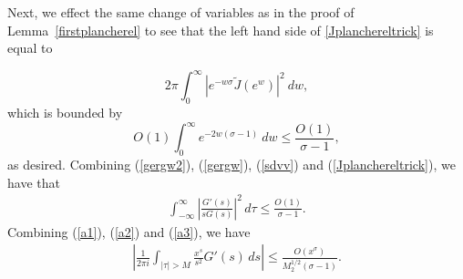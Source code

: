 \documentclass[11pt]{amsart}
\theoremstyle{definition}
\begin{document}
 Next, we effect the same change of variables as in the proof of Lemma~\ref{firstplancherel} to see that the left hand side of \eqref{Jplanchereltrick} is equal to
 
 \[
 2\pi \int_0^{\infty} \left|e^{-w\sigma} \tilde{J}(e^w)\right|^2  \ dw,
 \]
 which is bounded by
 \[
 O(1) \int_0^{\infty} e^{-2w(\sigma-1)} \ dw \leq \frac{O(1)}{\sigma-1},
 \]
 as desired.
 Combining (\ref{gergw2}), (\ref{gergw}), (\ref{sdvv}) and (\ref{Jplanchereltrick}), we have that 
 \begin{equation}\label{a3}
    \begin{split}
       \int_{-\infty}^{\infty}\left|\frac{G'(s)}{s G(s)}\right|^{2}\,d\tau
       \leq \frac{O(1)}{\sigma-1}.
    \end{split}
 \end{equation}
 Combining  (\ref{a1}), (\ref{a2}) and (\ref{a3}), we have 
  \begin{equation}\label{e1}
    \begin{split}
        \left|\frac{1}{2\pi i}\int_{\vert\tau\vert>M}\frac{x^{s}}{s^{2}}G'(s)\,ds\right|\leq \frac{O(x^{\sigma})}{M_{2}^{1/2}(\sigma-1)}.
    \end{split}
 \end{equation}
\end{document}
